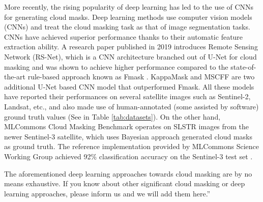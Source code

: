 \documentclass[sigplan,screen]{acmart}
\begin{document}
More recently, the rising popularity of deep learning has led to the use of CNNs for generating cloud masks. Deep learning methods \cite{Li2019DeepLB,Domnich2021KappaMaskAC,Yan2018CloudAC,WIELAND2019111203,JEPPESEN2019247} use computer vision models (CNNs) and treat the cloud masking task as that of image segmentation tasks. CNNs have achieved superior performance thanks to their automatic feature extraction ability. A research paper published in 2019 \cite{JEPPESEN2019247} introduces Remote Sensing Network (RS-Net), which is a CNN architecture branched out of U-Net \cite{RFB15a} for cloud masking and was shown to achieve higher performance compared to the state-of-the-art rule-based approach known as Fmask \cite{Zhu2012ObjectbasedCA}. KappaMask \cite{Domnich2021KappaMaskAC} and MSCFF \cite{Li2019DeepLB} are two additional U-Net based CNN model that outperformed Fmask. All these models have reported their performances on several satellite images such as Sentinel-2, Landsat, etc., and also made use of human-annotated (some assisted by software) ground truth values (See in Table \ref{tab:datasets}). On the other hand, MLCommons Cloud Masking Benchmark operates on SLSTR images from the newer Sentinel-3 satellite, which uses Bayesian approach generated cloud masks as ground truth. The reference implementation provided by MLCommons Science Working Group achieved 92\% classification accuracy on the Sentinel-3 test set \cite{Thiyagalingam2022AIBF}.

The aforementioned deep learning approaches towards cloud masking are by no means exhaustive. If you know about other significant cloud masking or deep learning approaches, please inform us and we will add them here.''
\end{document}

